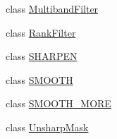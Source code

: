 \begin{DoxyCompactItemize}
\item 
class \hyperlink{classPIL_1_1ImageFilter_1_1MultibandFilter}{Multiband\+Filter}
\item 
class \hyperlink{classPIL_1_1ImageFilter_1_1RankFilter}{Rank\+Filter}
\item 
class \hyperlink{classPIL_1_1ImageFilter_1_1SHARPEN}{S\+H\+A\+R\+P\+EN}
\item 
class \hyperlink{classPIL_1_1ImageFilter_1_1SMOOTH}{S\+M\+O\+O\+TH}
\item 
class \hyperlink{classPIL_1_1ImageFilter_1_1SMOOTH__MORE}{S\+M\+O\+O\+T\+H\+\_\+\+M\+O\+RE}
\item 
class \hyperlink{classPIL_1_1ImageFilter_1_1UnsharpMask}{Unsharp\+Mask}
\end{DoxyCompactItemize}
